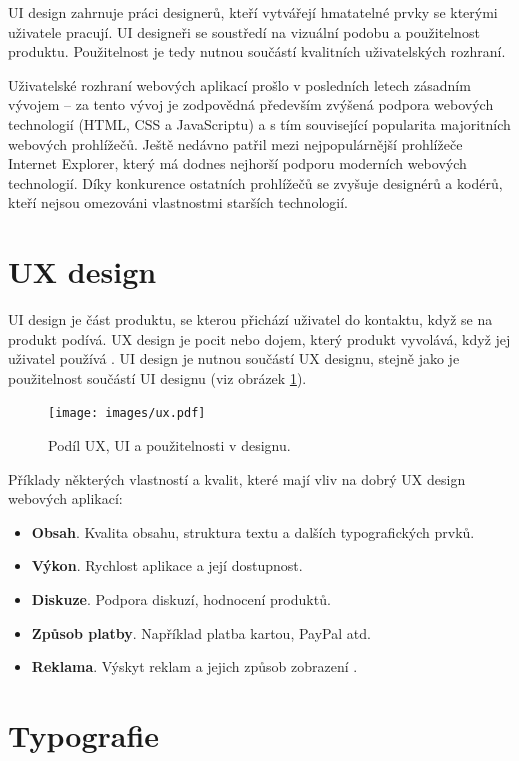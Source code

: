 UI design zahrnuje práci designerů, kteří vytvářejí hmatatelné prvky se kterými uživatele pracují. UI designeři se soustředí na vizuální podobu a použitelnost produktu. Použitelnost je tedy nutnou součástí kvalitních uživatelských rozhraní.

Uživatelské rozhraní webových aplikací prošlo v posledních letech zásadním vývojem -- za tento vývoj je zodpovědná především zvýšená podpora webových technologií (HTML, CSS a JavaScriptu) a s tím související popularita majoritních webových prohlížečů. Ještě nedávno patřil mezi nejpopulárnější prohlížeče Internet Explorer, který má dodnes nejhorší podporu moderních webových technologií. Díky konkurence ostatních prohlížečů se zvyšuje  designérů a kodérů, kteří nejsou omezováni vlastnostmi starších technologií.

\section{UX design}
\label{sec:uxdesign}

UI design je část produktu, se kterou přichází uživatel do kontaktu, když se na produkt podívá. UX design je pocit nebo dojem, který produkt vyvolává, když jej uživatel používá \cite{3}. UI design je nutnou součástí UX designu, stejně jako je použitelnost součástí UI designu (viz obrázek \ref{fig:ux-ui-usability}).

\begin{figure}[htbp]
    \centering
    \texttt{[image: images/ux.pdf]}
    \caption{Podíl UX, UI a použitelnosti v designu.}
    \label{fig:ux-ui-usability}
\end{figure}

Příklady některých vlastností a kvalit, které mají vliv na dobrý UX design webových aplikací:

\begin{itemize}
    \item \textbf{Obsah}. Kvalita obsahu, struktura textu a dalších typografických prvků.
    \item \textbf{Výkon}. Rychlost aplikace a její dostupnost.
    \item \textbf{Diskuze}. Podpora diskuzí, hodnocení produktů.
    \item \textbf{Způsob platby}. Například platba kartou, PayPal atd.
    \item \textbf{Reklama}. Výskyt reklam a jejich způsob zobrazení \cite{4}.
\end{itemize}

\section{Typografie}
\label{sec:typografie}

